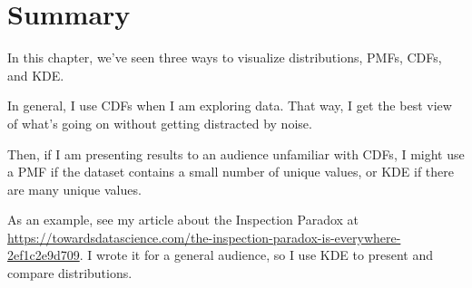 \hypertarget{summary}{%
\section{Summary}\label{summary}}

In this chapter, we've seen three ways to visualize distributions, PMFs,
CDFs, and KDE.

In general, I use CDFs when I am exploring data. That way, I get the
best view of what's going on without getting distracted by noise.

Then, if I am presenting results to an audience unfamiliar with CDFs, I
might use a PMF if the dataset contains a small number of unique values,
or KDE if there are many unique values.

As an example, see my article about the Inspection Paradox at
\url{https://towardsdatascience.com/the-inspection-paradox-is-everywhere-2ef1c2e9d709}.
I wrote it for a general audience, so I use KDE to present and compare
distributions.

